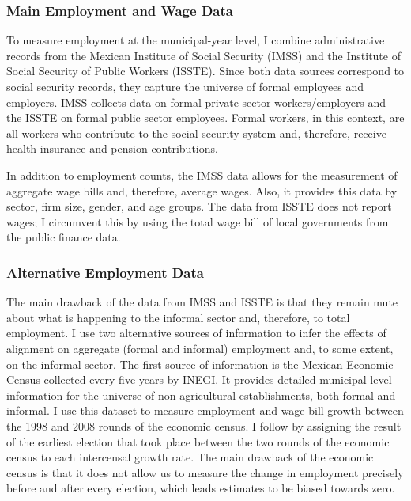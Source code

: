 \documentclass[dv_diss_main.tex]{subfiles}
\begin{document}
\subsubsection{Main Employment and Wage Data} To measure employment at the municipal-year level, I combine administrative records from the Mexican Institute of Social Security (IMSS) and the Institute of Social Security of Public Workers (ISSTE). Since both data sources correspond to social security records, they capture the universe of formal employees and employers. IMSS collects data on formal private-sector workers/employers and the ISSTE on formal public sector employees. Formal workers, in this context, are all workers who contribute to the social security system and, therefore, receive health insurance and pension contributions.

In addition to employment counts, the IMSS data allows for the measurement of aggregate wage bills and, therefore, average wages. Also, it provides this data by sector, firm size, gender, and age groups. The data from ISSTE does not report wages; I circumvent this by using the total wage bill of local governments from the public finance data.


\subsubsection{Alternative Employment Data} The main drawback of the data from IMSS and ISSTE is that they remain mute about what is happening to the informal sector and, therefore, to total employment. I use two alternative sources of information to infer the effects of alignment on aggregate (formal and informal) employment and, to some extent, on the informal sector.
The first source of information is the Mexican Economic Census collected every five years by INEGI. It provides detailed municipal-level information for the universe of non-agricultural establishments, both formal and informal. I use this dataset to measure employment and wage bill growth between the 1998 and 2008 rounds of the economic census.  I follow \cite{asher2017politics} by assigning the result of the earliest election that took place between the two rounds of the economic census to each intercensal growth rate. The main drawback of the economic census is that it does not allow us to measure the change in employment precisely before and after every election, which leads estimates to be biased towards zero. 
\end{document}
